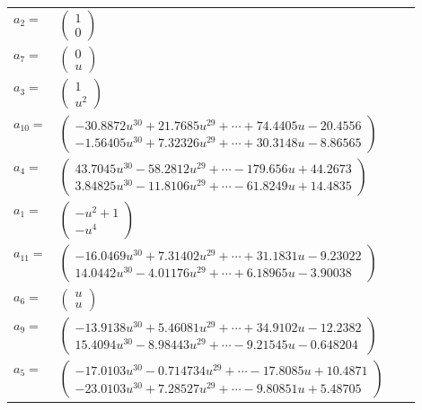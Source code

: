 \documentclass[1p]{elsarticle_modified}
\theoremstyle{definition}
\begin{document}
\begin{tabular}{m{7pt} m{180pt} m{7pt} m{180pt} }
\flushright $a_{2}=$&$\begin{pmatrix}1\\0\end{pmatrix}$ \\
\flushright $a_{7}=$&$\begin{pmatrix}0\\u\end{pmatrix}$ \\
\flushright $a_{3}=$&$\begin{pmatrix}1\\u^2\end{pmatrix}$ \\
\flushright $a_{10}=$&$\begin{pmatrix}-30.8872 u^{30}+21.7685 u^{29}+\cdots+74.4405 u-20.4556\\-1.56405 u^{30}+7.32326 u^{29}+\cdots+30.3148 u-8.86565\end{pmatrix}$ \\
\flushright $a_{4}=$&$\begin{pmatrix}43.7045 u^{30}-58.2812 u^{29}+\cdots-179.656 u+44.2673\\3.84825 u^{30}-11.8106 u^{29}+\cdots-61.8249 u+14.4835\end{pmatrix}$ \\
\flushright $a_{1}=$&$\begin{pmatrix}- u^2+1\\- u^4\end{pmatrix}$ \\
\flushright $a_{11}=$&$\begin{pmatrix}-16.0469 u^{30}+7.31402 u^{29}+\cdots+31.1831 u-9.23022\\14.0442 u^{30}-4.01176 u^{29}+\cdots+6.18965 u-3.90038\end{pmatrix}$ \\
\flushright $a_{6}=$&$\begin{pmatrix}u\\u\end{pmatrix}$ \\
\flushright $a_{9}=$&$\begin{pmatrix}-13.9138 u^{30}+5.46081 u^{29}+\cdots+34.9102 u-12.2382\\15.4094 u^{30}-8.98443 u^{29}+\cdots-9.21545 u-0.648204\end{pmatrix}$ \\
\flushright $a_{5}=$&$\begin{pmatrix}-17.0103 u^{30}-0.714734 u^{29}+\cdots-17.8085 u+10.4871\\-23.0103 u^{30}+7.28527 u^{29}+\cdots-9.80851 u+5.48705\end{pmatrix}$ \\

\end{tabular}
\end{document}
